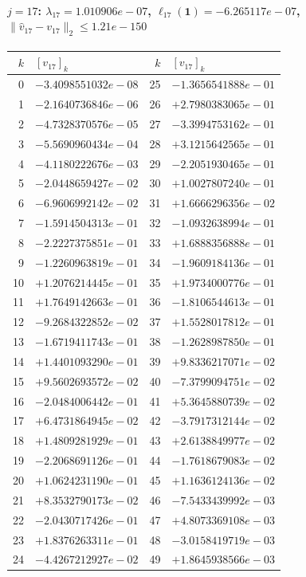 \documentclass[11pt]{article}
\begin{document}
\paragraph{$j = 17$: $\lambda_{17} = 1.010906e-07$, \quad $\ell_{17}(\mathbf{1}) = -6.265117e-07$, \quad $\|\hat{v}_{17} - v_{17}\|_2 \leq 1.21e-150$}
\begin{center}
{\footnotesize
\begin{tabular}{r@{\;\;}l@{\quad}r@{\;\;}l}
\toprule
$k$ & $[v_{17}]_k$ & $k$ & $[v_{17}]_k$ \\
\midrule
0 & $-3.4098551032e-08$ & 25 & $-1.3656541888e-01$ \\
1 & $-2.1640736846e-06$ & 26 & $+2.7980383065e-01$ \\
2 & $-4.7328370576e-05$ & 27 & $-3.3994753162e-01$ \\
3 & $-5.5690960434e-04$ & 28 & $+3.1215642565e-01$ \\
4 & $-4.1180222676e-03$ & 29 & $-2.2051930465e-01$ \\
5 & $-2.0448659427e-02$ & 30 & $+1.0027807240e-01$ \\
6 & $-6.9606992142e-02$ & 31 & $+1.6666296356e-02$ \\
7 & $-1.5914504313e-01$ & 32 & $-1.0932638994e-01$ \\
8 & $-2.2227375851e-01$ & 33 & $+1.6888356888e-01$ \\
9 & $-1.2260963819e-01$ & 34 & $-1.9609184136e-01$ \\
10 & $+1.2076214445e-01$ & 35 & $+1.9734000776e-01$ \\
11 & $+1.7649142663e-01$ & 36 & $-1.8106544613e-01$ \\
12 & $-9.2684322852e-02$ & 37 & $+1.5528017812e-01$ \\
13 & $-1.6719411743e-01$ & 38 & $-1.2628987850e-01$ \\
14 & $+1.4401093290e-01$ & 39 & $+9.8336217071e-02$ \\
15 & $+9.5602693572e-02$ & 40 & $-7.3799094751e-02$ \\
16 & $-2.0484006442e-01$ & 41 & $+5.3645880739e-02$ \\
17 & $+6.4731864945e-02$ & 42 & $-3.7917312144e-02$ \\
18 & $+1.4809281929e-01$ & 43 & $+2.6138849977e-02$ \\
19 & $-2.2068691126e-01$ & 44 & $-1.7618679083e-02$ \\
20 & $+1.0624231190e-01$ & 45 & $+1.1636124136e-02$ \\
21 & $+8.3532790173e-02$ & 46 & $-7.5433439992e-03$ \\
22 & $-2.0430717426e-01$ & 47 & $+4.8073369108e-03$ \\
23 & $+1.8376263311e-01$ & 48 & $-3.0158419719e-03$ \\
24 & $-4.4267212927e-02$ & 49 & $+1.8645938566e-03$ \\
\bottomrule
\end{tabular}
}
\end{center}
\end{document}
